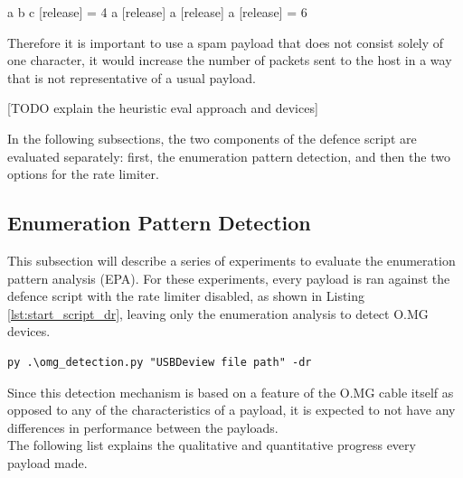 a b c [release] = 4
a [release] a [release] a [release] = 6

Therefore it is important to use a spam payload that does not consist solely of one character, it would increase the number of packets sent to the host in a way that is not representative of a usual payload.


[TODO explain the heuristic eval approach and devices]

In the following subsections, the two components of the defence script are evaluated separately: first, the enumeration pattern detection, and then the two options for the rate limiter.



\subsection{Enumeration Pattern Detection}

This subsection will describe a series of experiments to evaluate the enumeration pattern analysis (EPA). For these experiments, every payload is ran against the defence script with the rate limiter disabled, as shown in Listing \ref{lst:start_script_dr}, leaving only the enumeration analysis to detect O.MG devices.

\begin{lstlisting}[caption={start defence Script with Rate Limiter disabled},label={lst:start_script_dr}, captionpos=b]
 py .\omg_detection.py "USBDeview file path" -dr
\end{lstlisting}

Since this detection mechanism is based on a feature of the O.MG cable itself as opposed to any of the characteristics of a payload, it is expected to not have any differences in performance between the payloads. \\
The following list explains the qualitative and quantitative progress every payload made.

